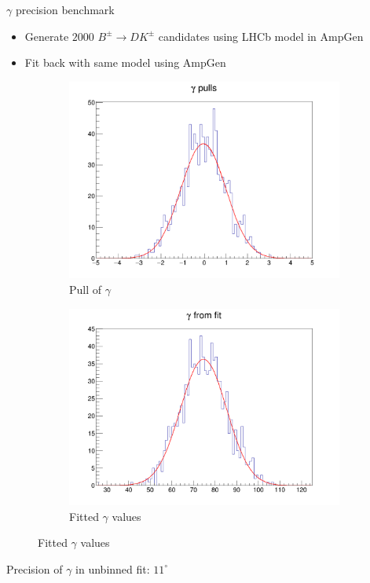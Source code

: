 \documentclass{beamer}
\begin{document}
\begin{frame}{$\gamma$ precision benchmark}
  \begin{itemize}
    \item{Generate $2000$ $B^\pm\to DK^\pm$ candidates using LHCb model in AmpGen}
    \item{Fit back with same model using AmpGen}
  \end{itemize}
  \begin{figure}
    \centering
    \vspace{-0.2cm}
    \begin{subfigure}{0.5\textwidth}
      \includegraphics[width = 1.0\textwidth]{Plots/AmpGen_UnbinnedFit_gamma_pull.png}
      \caption{Pull of $\gamma$}
    \end{subfigure}%
    \begin{subfigure}{0.5\textwidth}
      \includegraphics[width = 1.0\textwidth]{Plots/AmpGen_UnbinnedFit_gamma_fitted.png}
      \caption{Fitted $\gamma$ values}
    \end{subfigure}
  \end{figure}
  \begin{center}
    Precision of $\gamma$ in unbinned fit: $11^\circ$
  \end{center}
\end{frame}
\end{document}
